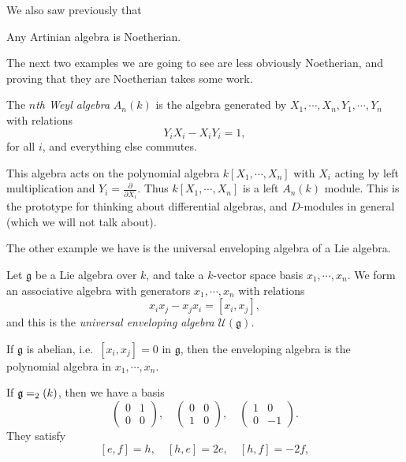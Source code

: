 \documentclass[a4paper]{article}
\begin{document}
We also saw previously that
\begin{eg}
  Any Artinian algebra is Noetherian.
\end{eg}

The next two examples we are going to see are less obviously Noetherian, and proving that they are Noetherian takes some work.

\begin{defi}
  The \emph{$n$th Weyl algebra} $A_n(k)$ is the algebra generated by $X_1, \cdots, X_n, Y_1, \cdots, Y_n$ with relations
  \[
    Y_i X_i - X_i Y_i = 1,
  \]
  for all $i$, and everything else commutes.
\end{defi}

This algebra acts on the polynomial algebra $k[X_1, \cdots, X_n]$ with $X_i$ acting by left multiplication and $Y_i = \frac{\partial}{\partial X_i}$. Thus $k[X_1, \cdots, X_n]$ is a left $A_n(k)$ module. This is the prototype for thinking about differential algebras, and $D$-modules in general (which we will not talk about).

The other example we have is the universal enveloping algebra of a Lie algebra.
\begin{defi}
  Let $\mathfrak{g}$ be a Lie algebra over $k$, and take a $k$-vector space basis $x_1, \cdots, x_n$. We form an associative algebra with generators $x_1, \cdots, x_n$ with relations
  \[
    x_i x_j - x_j x_i = [x_i, x_j],
  \]
  and this is the \emph{universal enveloping algebra} $\mathcal{U}(\mathfrak{g})$.
\end{defi}

\begin{eg}
  If $\mathfrak{g}$ is abelian, i.e.\ $[x_i, x_j] = 0$ in $\mathfrak{g}$, then the enveloping algebra is the polynomial algebra in $x_1, \cdots, x_n$.
\end{eg}

\begin{eg}
  If $\mathfrak{g} = \sl_2(k)$, then we have a basis
  \[
    \begin{pmatrix}
      0 & 1\\
      0 & 0
    \end{pmatrix},\quad
    \begin{pmatrix}
      0 & 0\\
      1 & 0
    \end{pmatrix},\quad
    \begin{pmatrix}
      1 & 0\\
      0 & -1
    \end{pmatrix}.
  \]
  They satisfy
  \[
    [e, f] = h,\quad [h, e] = 2e,\quad [h, f] = -2f,
  \]
\end{eg}
\end{document}
